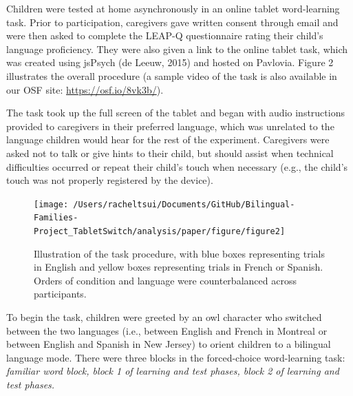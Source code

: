 \documentclass[
  man,floatsintext]{apa7}
\begin{document}
Children were tested at home asynchronously in an online tablet word-learning task. Prior to participation, caregivers gave written consent through email and were then asked to complete the LEAP-Q questionnaire rating their child's language proficiency. They were also given a link to the online tablet task, which was created using jsPsych (de Leeuw, 2015) and hosted on Pavlovia. Figure 2 illustrates the overall procedure (a sample video of the task is also available in our OSF site: \url{https://osf.io/8vk3b/}).

The task took up the full screen of the tablet and began with audio instructions provided to caregivers in their preferred language, which was unrelated to the language children would hear for the rest of the experiment. Caregivers were asked not to talk or give hints to their child, but should assist when technical difficulties occurred or repeat their child's touch when necessary (e.g., the child's touch was not properly registered by the device).

\begin{figure}[H]

{\centering \texttt{[image: /Users/racheltsui/Documents/GitHub/Bilingual-Families-Project\_TabletSwitch/analysis/paper/figure/figure2]} 

}

\caption{Illustration of the task procedure, with blue boxes representing trials in English and yellow boxes representing trials in French or Spanish. Orders of condition and language were counterbalanced across participants.   }\label{fig:Figure2}
\end{figure}

To begin the task, children were greeted by an owl character who switched between the two languages (i.e., between English and French in Montreal or between English and Spanish in New Jersey) to orient children to a bilingual language mode. There were three blocks in the forced-choice word-learning task: \emph{familiar word block, block 1 of learning and test phases, block 2 of learning and test phases.}
\end{document}
